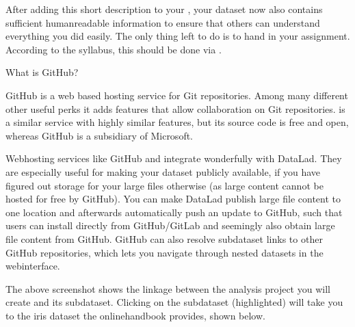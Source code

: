 \sphinxAtStartPar
After adding this short description to your , your dataset now also
contains sufficient human\sphinxhyphen{}readable information to ensure that others can understand
everything you did easily.
The only thing left to do is to hand in your assignment. According to the
syllabus, this should be done via {\hyperref[\detokenize{glossary:term-GitHub}]{}}.

\ignorespaces \begin{findoutmore}[label={index-10}, before title={\thetcbcounter\ }, check odd page=true]{What is GitHub?}
\label{\detokenize{basics/101-130-yodaproject:index-10}}

\sphinxAtStartPar
GitHub is a web based hosting service for Git repositories. Among many
different other useful perks it adds features that allow collaboration on
Git repositories.  is a similar
service with highly similar features, but its source code is free and open,
whereas GitHub is a subsidiary of Microsoft.

\sphinxAtStartPar
Web\sphinxhyphen{}hosting services like GitHub and {\hyperref[\detokenize{glossary:term-GitLab}]{}} integrate wonderfully with
DataLad. They are especially useful for making your dataset publicly available,
if you have figured out storage for your large files otherwise (as large content
cannot be hosted for free by GitHub). You can make DataLad publish large file content to one location
and afterwards automatically push an update to GitHub, such that
users can install directly from GitHub/GitLab and seemingly also obtain large file
content from GitHub. GitHub can also resolve subdataset links to other GitHub
repositories, which lets you navigate through nested datasets in the web\sphinxhyphen{}interface.

\noindent{}

\sphinxAtStartPar
The above screenshot shows the linkage between the analysis project you will create
and its subdataset. Clicking on the subdataset (highlighted) will take you to the iris dataset
the online\sphinxhyphen{}handbook provides, shown below.

\noindent{}


\end{findoutmore}

